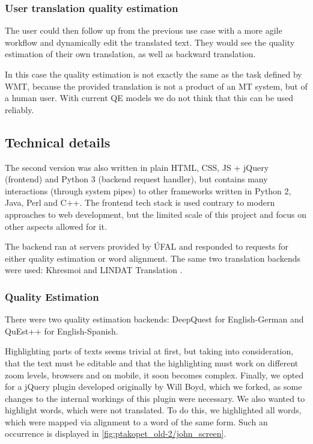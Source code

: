 \subsubsection*{User translation quality estimation}

The user could then follow up from the previous use case with a more agile workflow and dynamically edit the translated text. They would see the quality estimation of their own translation, as well as backward translation.

In this case the quality estimation is not exactly the same as the task defined by WMT, because the provided translation is not a product of an MT system, but of a human user. With current QE models we do not think that this can be used reliably.

\subsection{Technical details}

The second version was also written in plain HTML, CSS, JS + jQuery (frontend) and Python 3 (backend request handler), but contains many interactions (through system pipes) to other frameworks written in Python 2, Java, Perl and C++. The frontend tech stack is used contrary to modern approaches to web development, but the limited scale of this project and focus on other aspects allowed for it.

The backend ran at servers provided by ÚFAL and responded to requests for either quality estimation or word alignment. The same two translation backends were used: Khresmoi \citep{khresmoi} and LINDAT Translation \citep{popel-en-cs}.

\subsubsection*{Quality Estimation}

There were two quality estimation backends: DeepQuest for English-German and QuEst++ for English-Spanish. 

Highlighting parts of texts seems trivial at first, but taking into consideration, that the text must be editable and that the highlighting must work on different zoom levels, browsers and on mobile, it soon becomes complex.
Finally, we opted for a jQuery plugin developed originally by Will Boyd, which we forked, as some changes to the internal workings of this plugin were necessary.
We also wanted to highlight words, which were not translated. To do this, we highlighted all words, which were mapped via alignment to a word of the same form. Such an occurrence is displayed in \cref{fig:ptakopet_old-2/john_screen}.

